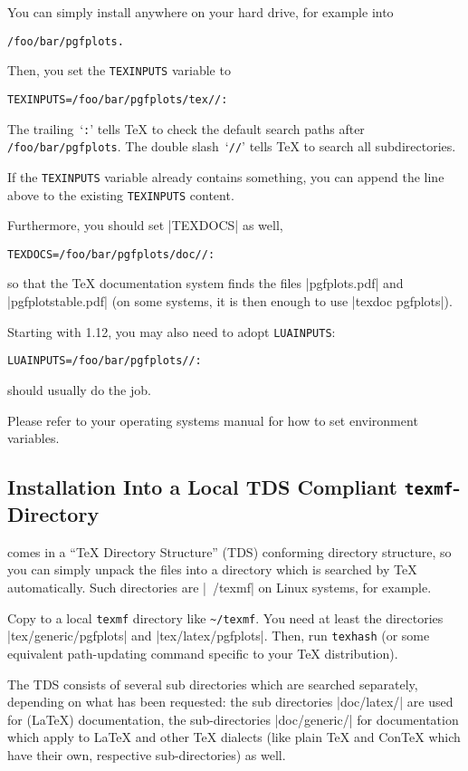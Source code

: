 You can simply install \PGFPlots{} anywhere on your hard drive, for example
into
%
\begin{verbatim}
/foo/bar/pgfplots.
\end{verbatim}
%
Then, you set the \texttt{TEXINPUTS} variable to
%
\begin{verbatim}
TEXINPUTS=/foo/bar/pgfplots/tex//:
\end{verbatim}
%
The trailing~`\texttt{:}' tells \TeX{} to check the default search paths after
\lstinline!/foo/bar/pgfplots!. The double slash~`\texttt{//}' tells \TeX{} to
search all subdirectories.

If the \texttt{TEXINPUTS} variable already contains something, you can append
the line above to the existing \texttt{TEXINPUTS} content.

Furthermore, you should set |TEXDOCS| as well,
%
\begin{verbatim}
TEXDOCS=/foo/bar/pgfplots/doc//:
\end{verbatim}
%
so that the \TeX{} documentation system finds the files |pgfplots.pdf| and
|pgfplotstable.pdf| (on some systems, it is then enough to use
|texdoc pgfplots|).

Starting with \PGFPlots{} 1.12, you may also need to adopt \texttt{LUAINPUTS}:
%
\begin{verbatim}
LUAINPUTS=/foo/bar/pgfplots//:
\end{verbatim}
%
should usually do the job.

Please refer to your operating systems manual for how to set environment
variables.


\subsection{Installation Into a Local TDS Compliant \texttt{texmf}-Directory}
\label{pgfplots:tds}

\PGFPlots{} comes in a ``\TeX{} Directory Structure'' (TDS) conforming
directory structure, so you can simply unpack the files into a directory which
is searched by \TeX{} automatically. Such directories are |~/texmf| on Linux
systems, for example.

Copy \PGFPlots{} to a local \texttt{texmf} directory like \lstinline!~/texmf!.
You need at least the \PGFPlots{} directories |tex/generic/pgfplots| and
|tex/latex/pgfplots|. Then, run \lstinline!texhash! (or some equivalent
path-updating command specific to your \TeX{} distribution).

The TDS consists of several sub directories which are searched separately,
depending on what has been requested: the sub directories
|doc/latex/| are used for (\LaTeX{}) documentation, the
sub-directories |doc/generic/| for documentation which apply to
\LaTeX{} and other \TeX{} dialects (like plain \TeX{} and Con\TeX{} which have
their own, respective sub-directories) as well.

